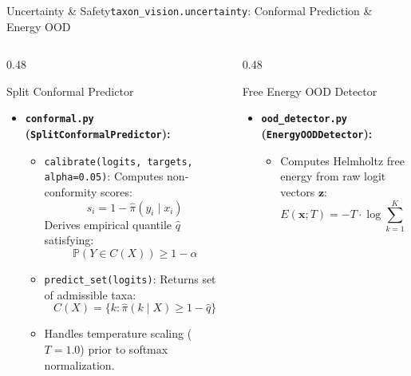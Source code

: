 \begin{frame}{Uncertainty \& Safety}{\texttt{taxon\_vision.uncertainty}: Conformal Prediction \& Energy OOD}
    \begin{columns}[T]
        \begin{column}{0.48\textwidth}
            \begin{block}{Split Conformal Predictor}
                \begin{itemize}\scriptsize
                    \item \textbf{\texttt{conformal.py} (\texttt{SplitConformalPredictor}):}
                        \begin{itemize}\tiny
                            \item \texttt{calibrate(logits, targets, alpha=0.05)}:
                                Computes non-conformity scores:
                                $$s_i = 1 - \hat{\pi}(y_i \mid x_i)$$
                                Derives empirical quantile $\hat{q}$ satisfying:
                                $$\mathbb{P}(Y \in C(X)) \ge 1 - \alpha$$
                            \item \texttt{predict\_set(logits)}:
                                Returns set of admissible taxa:
                                $$C(X) = \{k : \hat{\pi}(k \mid X) \ge 1 - \hat{q}\}$$
                            \item Handles temperature scaling ($T = 1.0$) prior to softmax normalization.
                        \end{itemize}
                \end{itemize}
            \end{block}
        \end{column}
        \begin{column}{0.48\textwidth}
            \begin{block}{Free Energy OOD Detector}
                \begin{itemize}\scriptsize
                    \item \textbf{\texttt{ood\_detector.py} (\texttt{EnergyOODDetector}):}
                        \begin{itemize}\tiny
                            \item Computes Helmholtz free energy from raw logit vectors $\mathbf{z}$:
                                $$E(\mathbf{x}; T) = -T \cdot \log \sum_{k=1}^K \exp(z_k / T)$$

\end{itemize}
\end{itemize}
\end{block}
\end{column}
\end{columns}
\end{frame}
